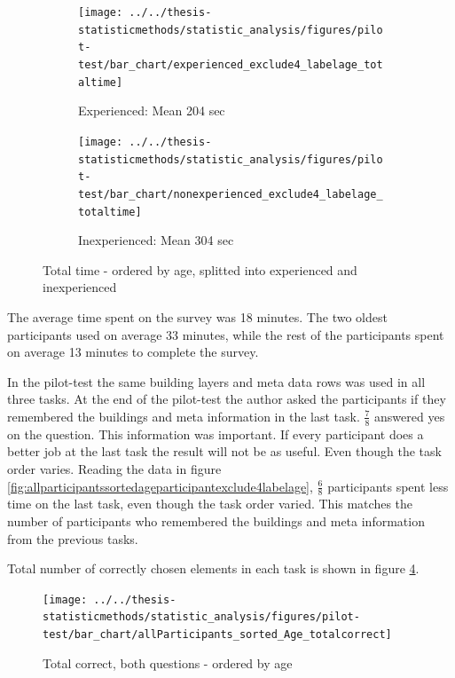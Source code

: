 \begin{figure}[H]
	\centering
	\begin{subfigure}[b]{0.45\textwidth}
		\centering
		\texttt{[image: ../../thesis-statisticmethods/statistic\_analysis/figures/pilot-test/bar\_chart/experienced\_exclude4\_labelage\_totaltime]}
		\caption{Experienced: Mean 204 sec}
		\label{fig:experiencedexclude4labelagetotaltime}
	\end{subfigure}
	\begin{subfigure}[b]{0.45\textwidth}
		\centering
		\texttt{[image: ../../thesis-statisticmethods/statistic\_analysis/figures/pilot-test/bar\_chart/nonexperienced\_exclude4\_labelage\_totaltime]}
		\caption{Inexperienced: Mean 304 sec}
		\label{fig:nonexperiencedexclude4labelagetotaltime}
	\end{subfigure}
	\caption[Total time, sorted]{Total time - ordered by age, splitted into experienced and inexperienced}
\end{figure}

The average time spent on the survey was 18 minutes. The two oldest participants used on average 33 minutes, while the rest of the participants spent on average 13 minutes to complete the survey. 

In the pilot-test the same building layers and meta data rows was used in all three tasks. At the end of the pilot-test the author asked the participants if they remembered the buildings and meta information in the last task. $\frac{7}{8}$ answered yes on the question. This information was important. If every participant does a better job at the last task the result will not be as useful. Even though the task order varies. Reading the data in figure \ref{fig:allparticipantssortedageparticipantexclude4labelage}, $\frac{6}{8}$ participants spent less time on the last task, even though the task order varied. This matches the number of participants who remembered the buildings and meta information from the previous tasks.

Total number of correctly chosen elements in each task is shown in figure \ref{fig:allparticipantssortedagetotalcorrect}. 

\begin{figure}[H]
	\centering
	\texttt{[image: ../../thesis-statisticmethods/statistic\_analysis/figures/pilot-test/bar\_chart/allParticipants\_sorted\_Age\_totalcorrect]}
	\caption[Total correct, ordered by age]{Total correct, both questions - ordered by age}
	\label{fig:allparticipantssortedagetotalcorrect}
\end{figure}

